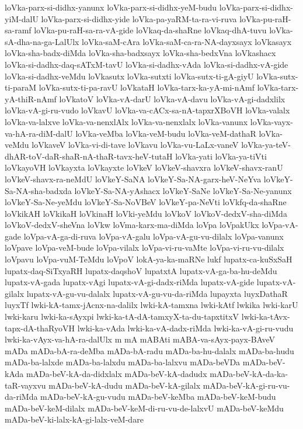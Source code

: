 {loVka-parx-si-didhx-yanunx
loVka-parx-si-didhx-yeM-budu
loVka-parx-si-didhx-yiM-dalU
loVka-parx-si-didhx-yide
loVka-pa-yaRM-ta-ra-vi-ruva
loVka-pu-raH-sa-ramf
loVka-pu-raH-sa-ra-vA-gide
loVkaq-da-shaRne
loVkaq-dhA-tuvu
loVka-sA-dha-na-ga-LalUlx
loVka-saM-cAra
loVka-saM-ca-ra-NA-dayxsayx
loVkasayx
loVka-sha-badx-diMda
loVka-sha-badxsayx
loVka-sha-bedxVna
loVkashacx
loVka-si-dadhx-daq-sATxM-tavU
loVka-si-dadhx-vAda
loVka-si-dadhx-vA-gide
loVka-si-dadhx-veMdu
loVkasutx
loVka-sutxti
loVka-sutx-ti-gA-giyU
loVka-sutx-ti-paraM
loVka-sutx-ti-pa-ravU
loVkataH
loVka-tarx-ka-yA-mi-nAmf
loVka-tarx-yA-thiR-nAmf
loVkatoV
loVka-vA-darU
loVka-vA-davu
loVka-vA-gi-dadxlilx
loVka-vA-gi-ru-vudo
loVkavU
loVka-va-cACx-sa-nA-tapxrXBoVH
loVka-valalx
loVka-va-lalxve
loVka-va-nenxlAlx
loVka-va-nenxlalx
loVka-vanunx
loVka-vayx-va-hA-ra-diM-dalU
loVka-veMba
loVka-veM-budu
loVka-veM-dathaR
loVka-veMdu
loVkaveV
loVka-vi-di-tave
loVkavu
loVka-vu-LaLx-vaneV
loVka-ya-teV-dhAR-toV-daR-shaR-nA-thaR-tavx-heV-tutaH
loVka-yati
loVka-ya-tiVti
loVkayoVH
loVkayxta
loVkayxte
loVkeV
loVkeV-shavxra
loVkeV-shavx-ranU
loVkeV-shavx-ra-neMdU
loVkeY-SaNA
loVkeY-Sa-NA-garx-heV-NeYva
loVkeY-Sa-NA-sha-badxda
loVkeY-Sa-NA-yAshacx
loVkeY-SaNe
loVkeY-Sa-Ne-yanunx
loVkeY-Sa-Ne-yeMdu
loVkeY-Sa-NoVBeV
loVkeY-pa-NeVti
loVkfq-da-shaRne
loVkikAH
loVkikaH
loVkinaH
loVki-yeMdu
loVkoV
loVkoV-dedxV-sha-diMda
loVkoV-dedxV-sheVna
loVkw
loVma-karx-ma-diMda
loVpa
loVpakUkx
loVpa-vA-gade
loVpa-vA-ga-di-ruva
loVpa-vA-galu
loVpa-vA-gu-vu-dilalx
loVpa-vanunx
loVpave
loVpa-veM-bude
loVpa-vilalx
loVpa-vi-ru-vaMte
loVpa-vi-ru-vu-dilalx
loVpavu
loVpa-vuM-TeMdu
loVpoV
lokA-ya-ka-maRNe
lukf
lupatx-ca-kuSxSaH
lupatx-daq-SiTxyaRH
lupatx-daqshoV
lupatxtA
lupatx-vA-ga-ba-hu-deMdu
lupatx-vA-gada
lupatx-vAgi
lupatx-vA-gi-dadx-riMda
lupatx-vA-gide
lupatx-vA-gilalx
lupatx-vA-gu-vu-dalalx
lupatx-vA-gu-vu-da-riMda
lupayxta
luyxDathaR
luyxTf
lwki-kA-tamx-jAcnx-na-dalilx
lwki-kA-tamxna
lwki-kAtf
lwkika
lwki-karU
lwki-karu
lwki-ka-sAyxpi
lwki-ka-tA-dA-tamxyX-ta-du-tapxtitxV
lwki-ka-tAvx-tapx-dA-thaRyoVH
lwki-ka-vAda
lwki-ka-vA-dadx-riMda
lwki-ka-vA-gi-ru-vudu
lwki-ka-vAyx-va-hA-ra-dalUlx
m
mA
mABAti
mABA-va-sAyx-payx-BAveV
mADa
mADa-bA-ra-deMba
mADa-bA-radu
mADa-ba-hu-dalalx
mADa-ba-hudu
mADa-ba-lalxde
mADa-ba-lalxdu
mADa-ba-lalxvu
mADa-beVDa
mADa-beV-kAda
mADa-beV-kA-da-didxlalx
mADa-beV-kA-dadudx
mADa-beV-kA-da-ka-taR-vayxvu
mADa-beV-kA-dudu
mADa-beV-kA-gilalx
mADa-beV-kA-gi-ru-vu-da-riMda
mADa-beV-kA-gu-vudu
mADa-beV-keMba
mADa-beV-keM-budu
mADa-beV-keM-dilalx
mADa-beV-keM-di-ru-vu-de-lalxvU
mADa-beV-keMdu
mADa-beV-ki-lalx-kA-gi-lalx-veM-dare
}
